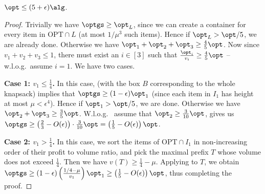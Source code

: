 \begin{lemma}
$\opt\le (5+\epsilon)\alg$.    
\end{lemma}
\begin{proof}
Trivially we have $\optgs \ge \opt_L$, since we can create a  container for every item in $\text{OPT}\cap L$ (at most $1/\mu^3$ such items). Hence if $\opt_L > \opt/5$, we are already done. Otherwise we have $\opt_1+\opt_2+\opt_3 \ge \frac{4}{5}\opt$. Now since $v_1 + v_2 + v_3 \le 1$, there must exist an $i \in [3]$ such that $\frac{\opt_i}{v_i} \ge \frac{4}{5}\opt$ -- w.l.o.g.~assume $i=1$. We have two cases.


\textbf{Case 1: $v_1 \le \frac{1}{4}$.} In this case,  (with the box $B$ corresponding to the whole knapsack) implies that $\optgs \ge (1-\epsilon)\opt_1$ (since each item in $I_1$ has height at most $\mu < \epsilon^4$). Hence if $\opt_1 > \opt/5$, we are done. Otherwise we have $\opt_2 + \opt_3 \ge \frac{3}{5}\opt$.  W.l.o.g.~ assume that $\opt_2 \ge \frac{3}{10}\opt$,  gives us $\optgs \ge \left(\frac{2}{3}-O(\epsilon)\right)\cdot \frac{3}{10}\opt = \left(\frac{1}{5}-O(\epsilon)\right)\opt$.


\textbf{Case 2: $v_1 > \frac{1}{4}$.} In this case, we sort the items of $\text{OPT}\cap I_1$ in non-increasing order of their profit to volume ratio, and pick the maximal prefix $T$ whose volume does not exceed $\frac{1}{4}$. Then we have $v(T) \ge \frac{1}{4}-\mu$. Applying  to $T$, we obtain
$\optgs \ge (1-\epsilon)\left(\frac{1/4-\mu}{v_1}\right)\opt_1 \ge \left(\frac{1}{5}-O(\epsilon)\right)\opt$,
thus completing the proof.
\end{proof}

